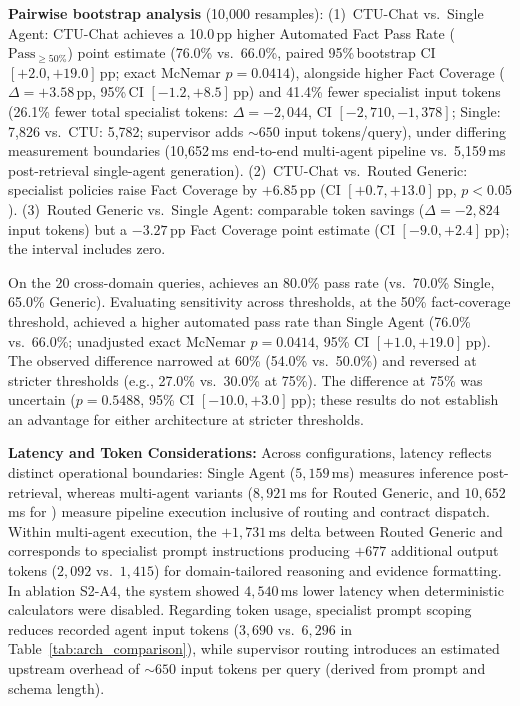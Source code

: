 \textbf{Pairwise bootstrap analysis} (10,000 resamples):
(1)~CTU-Chat vs.\ Single Agent: CTU-Chat achieves a 10.0\,pp higher Automated Fact Pass Rate ($\text{Pass}_{\ge 50\%}$) point estimate (76.0\% vs.\ 66.0\%, paired 95\%\,bootstrap CI $[+2.0, +19.0]$\,pp; exact McNemar $p{=}0.0414$), alongside higher Fact Coverage ($\Delta{=}+3.58$\,pp, 95\%\,CI $[-1.2, +8.5]$\,pp) and 41.4\% fewer specialist input tokens (26.1\% fewer total specialist tokens: $\Delta{=}-2{,}044$, CI $[-2{,}710, -1{,}378]$; Single: 7{,}826 vs.\ CTU: 5{,}782; supervisor adds ${\sim}650$ input tokens/query), under differing measurement boundaries (10{,}652\,ms end-to-end multi-agent pipeline vs.\ 5{,}159\,ms post-retrieval single-agent generation).
(2)~CTU-Chat vs.\ Routed Generic: specialist policies raise Fact Coverage by $+6.85$\,pp (CI $[+0.7, +13.0]$\,pp, $p{<}0.05$).
(3)~Routed Generic vs.\ Single Agent: comparable token savings ($\Delta{=}-2{,}824$ input tokens) but a $-3.27$\,pp Fact Coverage point estimate (CI $[-9.0, +2.4]$\,pp); the interval includes zero.

On the 20 cross-domain queries, \system{} achieves an 80.0\% pass rate (vs.\ 70.0\% Single, 65.0\% Generic). Evaluating sensitivity across thresholds, at the 50\% fact-coverage threshold, \system{} achieved a higher automated pass rate than Single Agent (76.0\% vs.\ 66.0\%; unadjusted exact McNemar $p{=}0.0414$, 95\% CI $[+1.0, +19.0]$\,pp). The observed difference narrowed at 60\% (54.0\% vs.\ 50.0\%) and reversed at stricter thresholds (e.g., 27.0\% vs.\ 30.0\% at 75\%). The difference at 75\% was uncertain ($p{=}0.5488$, 95\% CI $[-10.0, +3.0]$\,pp); these results do not establish an advantage for either architecture at stricter thresholds.

\textbf{Latency and Token Considerations:} Across configurations, latency reflects distinct operational boundaries: Single Agent ($5{,}159$\,ms) measures inference post-retrieval, whereas multi-agent variants ($8{,}921$\,ms for Routed Generic, and $10{,}652$\,ms for \system{}) measure pipeline execution inclusive of routing and contract dispatch. Within multi-agent execution, the $+1{,}731$\,ms delta between Routed Generic and \system{} corresponds to specialist prompt instructions producing $+677$ additional output tokens ($2{,}092$ vs.\ $1{,}415$) for domain-tailored reasoning and evidence formatting. In ablation S2-A4, the system showed $4{,}540$\,ms lower latency when deterministic calculators were disabled. Regarding token usage, specialist prompt scoping reduces recorded agent input tokens ($3{,}690$ vs.\ $6{,}296$ in Table~\ref{tab:arch_comparison}), while supervisor routing introduces an estimated upstream overhead of ${\sim}650$ input tokens per query (derived from prompt and schema length).

